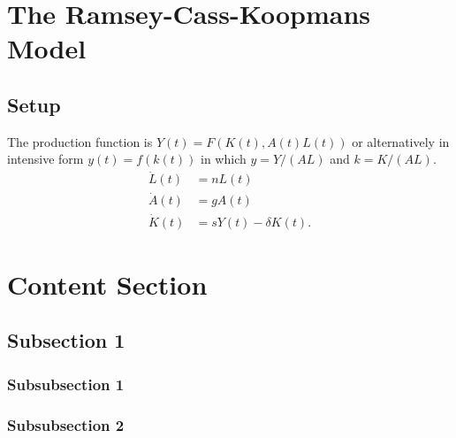 \documentclass[12pt]{article} %
\begin{document}
\newpage


\section{The Ramsey-Cass-Koopmans Model} 
\subsection{Setup} %
The production function is $Y(t)=F(K(t),A(t)L(t))$ or alternatively in intensive form $y(t)=f(k(t))$ in which $y=Y/(AL)$ and $k=K/(AL)$.
\begin{align*}
\dot{L}(t) & =nL(t) \\
\dot{A}(t) & =gA(t) \\
\dot{K}(t) & =sY(t)-\delta K(t).
\end{align*}
\section{Content Section} %

\lipsum[5] %


\subsection{Subsection 1} %

\subsubsection{Subsubsection 1} %

\lipsum[6] %


\subsubsection{Subsubsection 2} %

\lipsum[6] %
\lipsum[7-8] %

\end{document}
